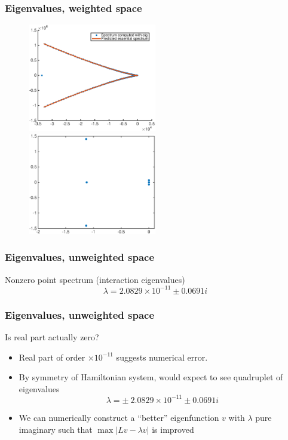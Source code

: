 \documentclass[16pt]{beamer}
\begin{document}
\begin{frame}
	\frametitle{Eigenvalues, weighted space}
	\fontsize{16}{7.2}\selectfont
	\begin{figure}
   		\includegraphics[width=0.5\textwidth]{images/stableeigweighted1.eps}
   		\hfill
   		\includegraphics[width=0.5\textwidth]{images/stableeigweighted2.eps}
	\end{figure}
\end{frame}

\begin{frame}
	\frametitle{Eigenvalues, unweighted space}
	\fontsize{16}{7.2}\selectfont
	\begin{block}{Nonzero point spectrum (interaction eigenvalues)}
		\[ \lambda = 2.0829 \times 10^{-11} \pm 0.0691i \]
	\end{block}
\end{frame}

\begin{frame}
	\frametitle{Eigenvalues, unweighted space}
	\fontsize{16}{7.2}\selectfont
	Is real part actually zero?
	\begin{itemize}
		\item<1->Real part of order $\times 10^{-11}$ suggests numerical error.
		\item<2->By symmetry of Hamiltonian system, would expect to see quadruplet of eigenvalues
		 \[ \lambda = \pm \: 2.0829 \times 10^{-11} \pm 0.0691i \]
		\item<3-> We can numerically construct a ``better'' eigenfunction $v$ with $\lambda$ pure imaginary such that $\max |Lv - \lambda v|$ is improved
	\end{itemize}
\end{frame}
\end{document}
